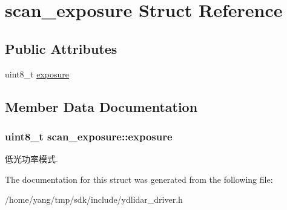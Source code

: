 \hypertarget{structscan__exposure}{}\section{scan\+\_\+exposure Struct Reference}
\label{structscan__exposure}
\subsection*{Public Attributes}
\begin{DoxyCompactItemize}
\item 
uint8\+\_\+t \hyperlink{structscan__exposure_a49591ef660667fcd1c3e1c2f3d764004}{exposure}
\end{DoxyCompactItemize}


\subsection{Member Data Documentation}
\subsubsection[{\texorpdfstring{exposure}{exposure}}]{\setlength{\rightskip}{0pt plus 5cm}uint8\+\_\+t scan\+\_\+exposure\+::exposure}\hypertarget{structscan__exposure_a49591ef660667fcd1c3e1c2f3d764004}{}\label{structscan__exposure_a49591ef660667fcd1c3e1c2f3d764004}
低光功率模式. 

The documentation for this struct was generated from the following file\+:\begin{DoxyCompactItemize}
\item 
/home/yang/tmp/sdk/include/ydlidar\+\_\+driver.\+h\end{DoxyCompactItemize}
